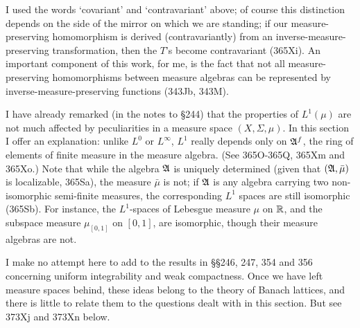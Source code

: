 {I used the words `covariant' and `contravariant' above;  of course
this distinction depends on the side of the mirror on which we are
standing;  if our measure-preserving homomorphism is derived
(contravariantly) from an inverse-measure-preserving transformation,
then the $T$'s become contravariant (365Xi).   An important
component of this work, for me, is the fact that not all
measure-preserving homomorphisms between measure algebras can be
represented by inverse-measure-preserving functions (343Jb, 343M).
     
I have already remarked (in the notes to \S244) that the properties of
$L^1(\mu)$ are not much affected by peculiarities in a measure space
$(X,\Sigma,\mu)$.   In this section I offer an explanation:  unlike
$L^0$ or $L^{\infty}$, $L^1$ really
depends only on $\frak A^f$, the ring of elements of finite measure in
the measure algebra.   (See 365O-365Q, %
365Xm and 365Xo.) %
Note that while the
algebra $\frak A$ is uniquely determined (given that $(\frak A,\bar\mu)$
is localizable, 365Sa), the measure $\bar\mu$ is not;  if $\frak A$ is
any algebra carrying two non-isomorphic semi-finite measures, the
corresponding $L^1$ spaces are still isomorphic (365Sb).   For instance,
the $L^1$-spaces of Lebesgue measure $\mu$ on $\Bbb R$, and the subspace
measure $\mu_{[0,1]}$ on $[0,1]$, are isomorphic, though their measure
algebras are not.
     
I make no attempt here to add to the results in \S\S246, 247, 354 and
356 concerning
uniform integrability and weak compactness.   Once we have left measure
spaces behind, these ideas belong to the theory of Banach lattices, and
there is little to relate them to the questions dealt with in this
section.   But see 373Xj and 373Xn below.
}%
     
\discrpage
     
